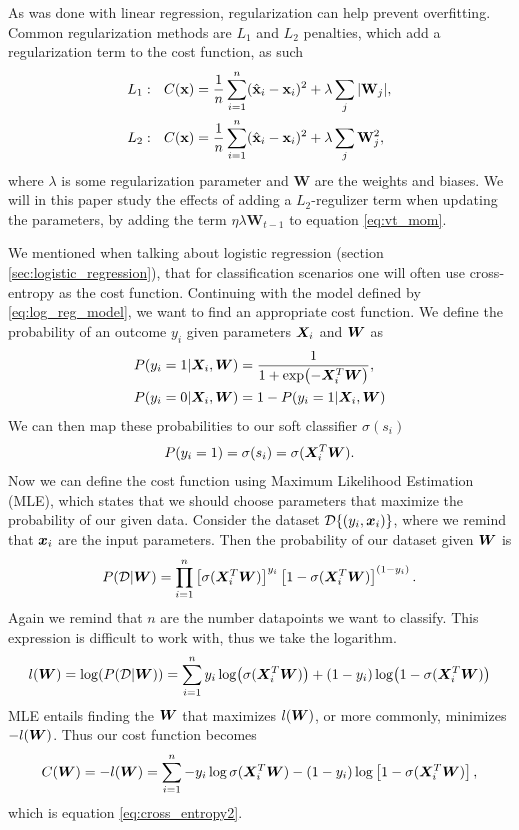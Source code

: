 \documentclass[12pt]{extarticle}
\begin{document}
As was done with linear regression, \cite{project1} regularization can help prevent overfitting. Common regularization methods are $L_1$ and $L_2$ penalties, which add a regularization term to the cost function, as such
\begin{align}
	L_1: \ \ C(\mathbf{x}) & = \frac{1}{n}\sum_{i=1}^{n}(\hat{\mathbf{x}}_i - \mathbf{x}_i)^2 + \lambda\sum_j \abs{\mathbf{W}_j}, \label{eq:L1} \\
	L_2: \ \ C(\mathbf{x}) & = \frac{1}{n}\sum_{i=1}^{n}(\hat{\mathbf{x}}_i - \mathbf{x}_i)^2 + \lambda\sum_j \mathbf{W}^2_j, \label{eq:L2}
\end{align}
where $\lambda$ is some regularization parameter and $\mathbf{W}$ are the weights and biases. We will in this paper study the effects of adding a $L_2$-regulizer term when updating the parameters, by adding the term $\eta \lambda \mathbf{W}_{t-1}$ to equation \eqref{eq:vt_mom}.

We mentioned when talking about logistic regression (section \ref{sec:logistic_regression}), that for classification scenarios one will often use cross-entropy as the cost function. Continuing with the model defined by \eqref{eq:log_reg_model}, we want to find an appropriate cost function. We define the probability of an outcome $y_i$ given parameters $\boldsymbol X_i$ and $\boldsymbol W$ as
\begin{align}
	P(y_i = 1|\boldsymbol X_i, \boldsymbol W) & = \frac{1}{1 + \exp(-\boldsymbol X_i^T \boldsymbol W)}, \\
	P(y_i = 0|\boldsymbol X_i, \boldsymbol W) & = 1 - P(y_i = 1|\boldsymbol X_i, \boldsymbol W)
\end{align}
We can then map these probabilities to our soft classifier $\sigma(s_i)$
\begin{align}
	P(y_i = 1) = \sigma(s_i) = \sigma(\boldsymbol X_i^T \boldsymbol W).
\end{align}
Now we can define the cost function using Maximum Likelihood Estimation (MLE), which states that we should choose parameters that maximize the probability of our given data. Consider the dataset $\mathcal{D}\{(y_i, \boldsymbol x_i)\}$, where we remind that $\boldsymbol x_i$ are the input parameters. Then the probability of our dataset given $\boldsymbol W$ is
\begin{align}
	P(\mathcal{D}|\boldsymbol W) = \prod_{i=1}^{n} \left[\sigma(\boldsymbol X_i^T\boldsymbol W)\right]^{y_i} \left[1 - \sigma(\boldsymbol X_i^T\boldsymbol W)\right]^{(1 - y_i)}.
\end{align}
Again we remind that $n$ are the number datapoints we want to classify. This expression is difficult to work with, thus we take the logarithm.
\begin{align}
	l(\boldsymbol W) = \log(P(\mathcal{D}|\boldsymbol W)) = \sum_{i = 1}^n y_i\log(\sigma(\boldsymbol X_i^T \boldsymbol W)) + (1-y_i)\log(1 - \sigma(\boldsymbol X_i^T \boldsymbol W))
\end{align}
MLE entails finding the $\boldsymbol W$ that maximizes $l(\boldsymbol W)$, or more commonly, minimizes $-l(\boldsymbol W)$. Thus our cost function becomes
\begin{align}
	C(\boldsymbol W) = -l(\boldsymbol W) = \sum_{i = 1}^{n} -y_i \log\sigma(\boldsymbol X_i^T \boldsymbol W) - (1 - y_i)\log\left[1 - \sigma(\boldsymbol X^T_i \boldsymbol W)\right],
	\label{eq:cross_entropy}
\end{align}
which is equation \eqref{eq:cross_entropy2}.
\end{document}
